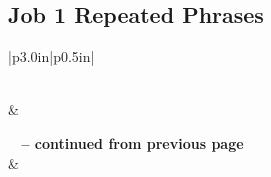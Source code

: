 \subsection{Job 1 Repeated Phrases}


\normalsize
 
\begin{center}
\begin{longtable}{|p{3.0in}|p{0.5in}|}
\caption[Job 1 Repeated Phrases]{Job 1 Repeated Phrases}\label{table:Repeated Phrases Job 1} \\
\hline {} &  \\ \hline 
\endfirsthead
 
{{\bfseries \tablename\ \thetable{} -- continued from previous page}} \\  
\hline {} &  \\ \hline 
\endhead
 

\end{longtable}
\end{center}
